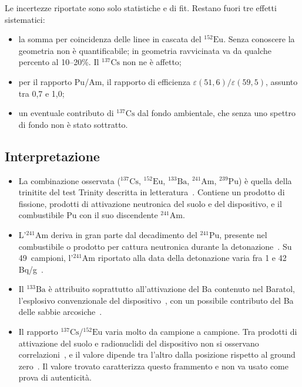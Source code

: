 \documentclass[11pt,a4paper]{article}
\newcommand{\nuc}[2]{\ensuremath{{}^{#1}\mathrm{#2}}}
\begin{document}
Le incertezze riportate sono solo statistiche e di fit. Restano fuori tre effetti sistematici:
\begin{itemize}
\item la somma per coincidenza delle linee in cascata del \nuc{152}{Eu}. Senza conoscere la geometria non è quantificabile; in geometria ravvicinata va da qualche percento al 10--20\%. Il \nuc{137}{Cs} non ne è affetto;
\item per il rapporto Pu/Am, il rapporto di efficienza $\varepsilon(51{,}6)/\varepsilon(59{,}5)$, assunto tra 0,7 e 1,0;
\item un eventuale contributo di \nuc{137}{Cs} dal fondo ambientale, che senza uno spettro di fondo non è stato sottratto.
\end{itemize}

\subsection{Interpretazione}

\begin{itemize}
\item La combinazione osservata (\nuc{137}{Cs}, \nuc{152}{Eu}, \nuc{133}{Ba}, \nuc{241}{Am}, \nuc{239}{Pu}) è quella della trinitite del test Trinity descritta in letteratura~\cite{parekh2006,belloni2011,nist2021,core,jrnc2013}. Contiene un prodotto di fissione, prodotti di attivazione neutronica del suolo e del dispositivo, e il combustibile Pu con il suo discendente \nuc{241}{Am}.
\item L'\nuc{241}{Am} deriva in gran parte dal decadimento del \nuc{241}{Pu}, presente nel combustibile o prodotto per cattura neutronica durante la detonazione~\cite{nist2021}. Su 49~campioni, l'\nuc{241}{Am} riportato alla data della detonazione varia fra 1 e 42\,Bq/g~\cite{jrnc2013}.
\item Il \nuc{133}{Ba} è attribuito soprattutto all'attivazione del Ba contenuto nel Baratol, l'esplosivo convenzionale del dispositivo~\cite{nist2021}, con un possibile contributo del Ba delle sabbie arcosiche~\cite{jrnc2013}.
\item Il rapporto \nuc{137}{Cs}/\nuc{152}{Eu} varia molto da campione a campione. Tra prodotti di attivazione del suolo e radionuclidi del dispositivo non si osservano correlazioni~\cite{jrnc2013}, e il valore dipende tra l'altro dalla posizione rispetto al ground zero~\cite{belloni2011}. Il valore trovato caratterizza questo frammento e non va usato come prova di autenticità.
\end{itemize}
\end{document}
